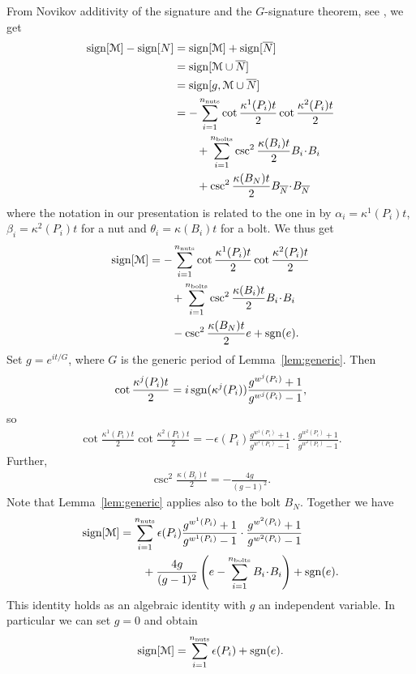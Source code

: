\documentclass[a4paper,11pt,reqno]{amsart}
\newcommand{\nut}{P}
\newcommand{\bolt}{B}
\newcommand{\sgn}{\mathop{\rm sgn}}
\newcommand{\sign}{\mathop{\rm sign}}
\newcommand{\cM}{\mathcal{M}}
\theoremstyle{plain}
\newcommand{\nnuts}{n_{\text{\rm nuts}}}
\newcommand{\nbolts}{n_{\text{\rm bolts}}}
\numberwithin{equation}{section}
\begin{document}
From Novikov additivity of the signature and the $G$-signature theorem, see \cite[Prop.~6.18]{AS-III}, we get
\begin{align}
\sign[\cM] - \sign[N] 
&=\sign[\cM] + \sign[\overline{N}] \\
&= \sign[\cM \cup \overline{N}] \\
&= \sign[g,\cM \cup \overline{N}] \\
%
%
%
%
&= - \sum_{i=1}^{\nnuts} \cot\frac{\kappa^1(\nut_i) t}{2}\cot\frac{\kappa^2(\nut_i) t}{2} \\
&\qquad
+ \sum_{i=1}^{\nbolts} \csc^2 \frac{\kappa(\bolt_i) t}{2} B_i \! \cdot \! B_i \\
&\qquad
+ \csc^2 \frac{\kappa(\bolt_N) t}{2} B_{\overline{N}} \!\cdot\! B_{\overline{N}}
\end{align}
where the notation in our presentation is related to the one in \cite[Prop.~6.18]{AS-III} by 
$\alpha_i = \kappa^1(\nut_i) t$, $\beta_i = \kappa^2(\nut_i) t$ for a nut and $\theta_i = \kappa(\bolt_i) t$ for a bolt.
We thus get
\begin{align}
\sign[\cM] 
&= - \sum_{i=1}^{\nnuts} \cot\frac{\kappa^1(\nut_i) t}{2}\cot\frac{\kappa^2(\nut_i) t}{2} \\
&\qquad
+ \sum_{i=1}^{\nbolts} \csc^2 \frac{\kappa(\bolt_i) t}{2} B_i \!\cdot\! B_i \\
&\qquad
- \csc^2 \frac{\kappa(\bolt_N) t}{2} e  +\sgn(e).
\end{align}
Set $g = e^{it/G}$, where $G$ is the generic period of Lemma~\ref{lem:generic}. Then
\begin{align}
\cot\frac{\kappa^j(\nut_i) t}{2} 
= i \sgn(\kappa^j(\nut_i)) \frac{g^{w^j(\nut_i)} + 1}{g^{w^j(\nut_i)} - 1},
\end{align}
so 
\begin{align}
\cot\frac{\kappa^1(\nut_i) t}{2} 
\cot\frac{\kappa^2(\nut_i) t}{2} 
= - \epsilon(\nut_i) 
\frac{g^{w^1(\nut_i)} + 1}{g^{w^1(\nut_i)} - 1} \cdot 
\frac{g^{w^2(\nut_i)} + 1}{g^{w^2(\nut_i)} - 1}.
\end{align}
Further, 
\begin{align}
\csc^2 \frac{\kappa(\bolt_i) t}{2} 
= -\frac{4g}{(g-1)^2}.
\end{align}
Note that Lemma~\ref{lem:generic} applies also to the bolt $B_N$. Together we have 
\begin{align} \label{eq:G-sign}
\sign[\cM] 
&= 
\sum_{i=1}^{\nnuts} \epsilon(\nut_i) 
\frac{g^{w^1(\nut_i)} + 1}{g^{w^1(\nut_i)} - 1} \cdot 
\frac{g^{w^2(\nut_i)} + 1}{g^{w^2(\nut_i)} - 1} \nonumber \\
&\qquad
+ \frac{4g}{(g-1)^2} \left( e - \sum_{i=1}^{\nbolts} B_i \!\cdot\! B_i \right) 
+ \sgn(e).
\end{align}
This identity holds as an algebraic identity with $g$ an independent variable. In particular we can set $g=0$ and obtain  
\begin{align} \label{eq:G-sign-g0}
\sign[\cM] = \sum_{i=1}^{\nnuts} \epsilon(\nut_i) + \sgn(e) .
\end{align} 
\end{document}
